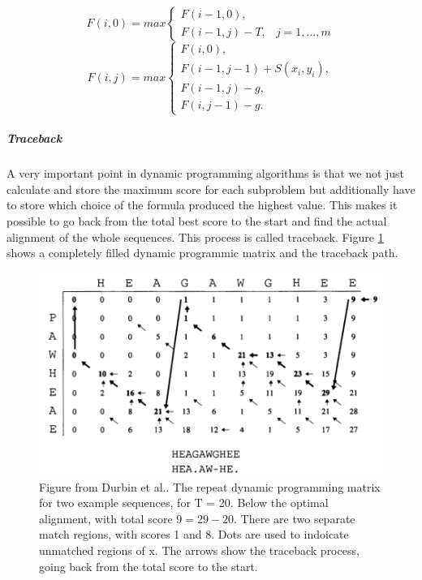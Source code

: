 \begin{equation}
F(i,0) = max \left\{ \begin{array}{lr}F(i-1,0),&\\F(i-1,j)-T,& j=1,\dots,m\end{array}\right. 
\label{eq:firstrow}
\end{equation}
\begin{equation}
F(i,j) = max \left\{ \begin{array}{lr}F(i,0),\\F(i-1,j-1)+S(x_i,y_i),\\F(i-1,j)-g,\\F(i,j-1)-g.\end{array}\right.
\label{eq:otherrows}
\end{equation}
		
\subparagraph{Traceback}
A very important point in dynamic programming algorithms is that we not just calculate and store the maximum score for each subproblem but additionally have to store which choice of the formula produced the highest value.
This makes it possible to go back from the total best score to the start and find the actual alignment of the whole sequences. This process is called traceback. 
Figure \ref{fig:durbindpmatrixtraceback} shows a completely filled dynamic programmic matrix and the traceback path.

\begin{figure}
\centering
\includegraphics[scale=0.4]{chapters/approach/smithwatermanrepeated.png}
\caption{Figure from Durbin et al.\cite{durbin1998}. The repeat dynamic programming matrix for two example sequences, for T = 20. Below the optimal alignment, with total score $9 = 29-20$. There are two separate match regions, with scores 1 and 8. Dots are used to indoicate unmatched regions of x. The arrows show the traceback process, going back from the total score to the start.}
\label{fig:durbindpmatrixtraceback}
\end{figure}

